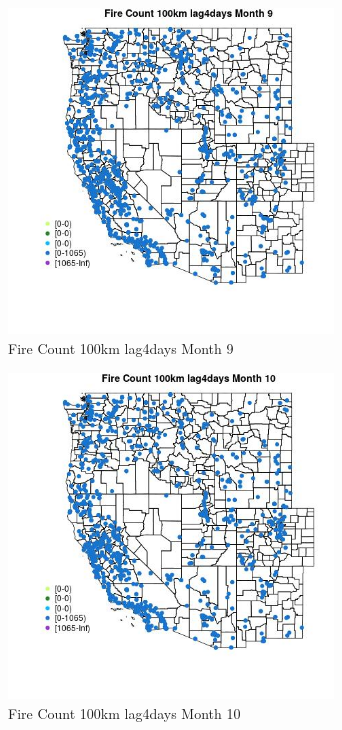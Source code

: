 \begin{figure} 
\centering  
\includegraphics[width=0.77\textwidth]{Code_Outputs/Report_ML_input_PM25_Step4_part_f_de_duplicated_aveswNAs_MapObsMo9Fire_Count_100km_lag4days.jpg} 
\caption{\label{fig:Report_ML_input_PM25_Step4_part_f_de_duplicated_aveswNAsMapObsMo9Fire_Count_100km_lag4days}Fire Count 100km lag4days Month 9} 
\end{figure} 
 

\begin{figure} 
\centering  
\includegraphics[width=0.77\textwidth]{Code_Outputs/Report_ML_input_PM25_Step4_part_f_de_duplicated_aveswNAs_MapObsMo10Fire_Count_100km_lag4days.jpg} 
\caption{\label{fig:Report_ML_input_PM25_Step4_part_f_de_duplicated_aveswNAsMapObsMo10Fire_Count_100km_lag4days}Fire Count 100km lag4days Month 10} 
\end{figure} 
 

